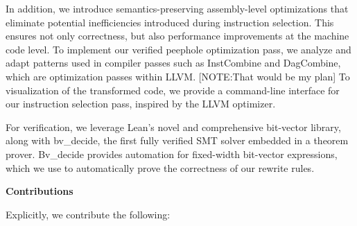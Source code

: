 In addition, we introduce semantics-preserving assembly-level optimizations that eliminate potential inefficiencies introduced during instruction selection. This ensures not only correctness, but also performance improvements at the machine code level. To implement our verified peephole optimization pass, we analyze and adapt patterns used in compiler passes such as InstCombine and DagCombine, which are optimization passes within LLVM. [NOTE:That would be my plan]
To visualization of the transformed code, we provide a command-line interface for our instruction selection pass, inspired by the LLVM optimizer. 

For verification, we leverage Lean’s novel and comprehensive bit-vector library, along with bv\_decide, the first fully verified SMT solver embedded in a theorem prover. Bv\_decide provides automation for fixed-width bit-vector expressions, which we use to automatically prove the correctness of our rewrite rules.

\textbf{Contributions}

Explicitly, we contribute the following:

